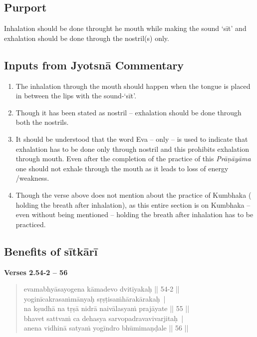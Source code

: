 \subsection*{Purport}


Inhalation should be done throught he mouth while making the sound ‘sīt’ and exhalation should be done through the nostril(s) only.

\subsection*{Inputs from Jyotsnā Commentary}


\begin{enumerate}
\itemsep=0pt
\item The inhalation through the mouth should happen when the tongue is placed in between the lips with the sound-‘sīt’.
\item Though it has been stated as nostril – exhalation should be done through both the nostrils. 
\item It should be understood that the word Eva – only – is used to indicate that exhalation has to be done only through nostril and this prohibits exhalation through mouth. Even after the completion of the practice of this \textit{Prāṇāyāma} one should not exhale through the mouth as it leads to loss of energy /weakness. 
\item Though the verse above does not mention about the practice of Kumbhaka ( holding the breath after inhalation), as this entire section is on Kumbhaka – even without being mentioned – holding the breath after inhalation has to be practiced. 
\end{enumerate}
\newpage

\subsection*{Benefits of sītkārī}


\noindent \textbf{Verses 2.54-2 -- 56}

\begin{verse}
evamabhyāsayogena kāmadevo dvitīyakaḥ || 54-2 ||\\
yoginīcakrasaṁmānyaḥ sṛṣṭisaṁhārakārakaḥ |\\
na kṣudhā na tṛṣā nidrā naivālasyaṁ prajāyate || 55 ||\\
bhavet sattvaṁ ca dehasya sarvopadravavivarjitaḥ |\\
anena vidhinā satyaṁ yogīndro bhūmimaṇḍale || 56 ||
\end{verse}

